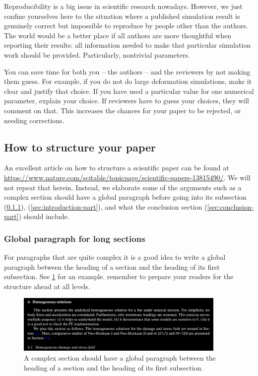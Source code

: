 \documentclass[authoryear,3p,times,preprint,review,fleqn]{elsarticle}
\numberwithin{equation}{section}
\theoremstyle{remark}
\begin{document}
Reproducibility is a big issue in scientific research nowadays. However, we just confine yourselves here to the situation where a published simulation result is genuinely correct but impossible to reproduce by people other than the authors. The world would be a better place if all authors are more thoughtful when reporting their results: all information needed to make that particular simulation work should be provided. Particularly, nontrivial parameters.

You can save time for both you -- the authors -- and the reviewers by not making them guess. For example, if you do not do large deformation simulations, make it clear and justify that choice. If you have used a particular value for one numerical parameter, explain your choice. If reviewers have to guess your choices, they will comment on that. This increases the chances for your paper to be rejected, or needing corrections.




\subsection{How to structure your paper}\label{structure}


An excellent article on how to structure a scientific paper can be found at \url{https://www.nature.com/scitable/topicpage/scientific-papers-13815490/}. We will not repeat that herein. Instead, we elaborate some of the arguments such as a complex section should have a global paragraph before going into its subsection (\cref{sec:global-para}), (\cref{sec:introduction-part}), and 
what the conclusion section (\cref{sec:conclusion-part}) should include.  

\subsubsection{Global paragraph for long sections}\label{sec:global-para}

For paragraphs that are quite complex it is a good idea to write a global paragraph between the heading of a section and the heading of its first subsection. See \cref{fig:section} for an example. remember to prepare your readers for the structure ahead at all levels. 


\begin{figure}[!h]
  \centering
  \includegraphics[width=0.9\textwidth]{section}
  \caption{A complex section should have a global paragraph between the heading of a section and the heading of its first subsection.}
  \label{fig:section}
\end{figure}
\end{document}
